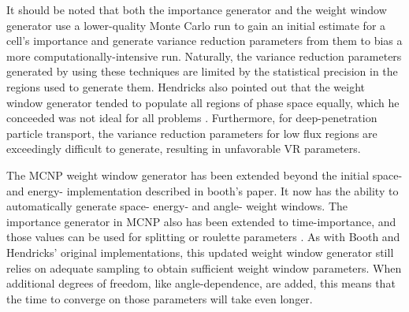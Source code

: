 It should be noted that both the importance generator and the weight window
generator use a lower-quality
Monte Carlo run to gain an initial estimate for a cell's importance and generate
variance reduction parameters from them to bias a more computationally-intensive
run. Naturally, the variance reduction parameters generated by using these
techniques are limited by the statistical precision in the regions used to
generate them. Hendricks also pointed out that the weight window generator
tended to populate all regions of phase space equally, which he conceeded was
not ideal for all problems \cite{hendricks_code-generated_1982}.
Furthermore, for deep-penetration particle transport, the
variance reduction parameters for low flux regions are exceedingly difficult to
generate, resulting in unfavorable VR parameters.

The MCNP \cite{mcnp_manual_v1, brown_mcnp_2002} weight window generator has been
extended beyond the initial space- and energy- implementation described in
booth's paper. It now has the ability to automatically generate space- energy-
and angle- weight windows. The importance generator in MCNP also has been
extended to time-importance, and those values can be used for splitting or
roulette parameters \cite{brown_mcnp_2002}. As with Booth and Hendricks'
original implementations, this updated weight window generator still relies on
adequate sampling to obtain sufficient weight window parameters. When additional
degrees of freedom, like angle-dependence, are added, this means that the time
to converge on those parameters will take even longer.

